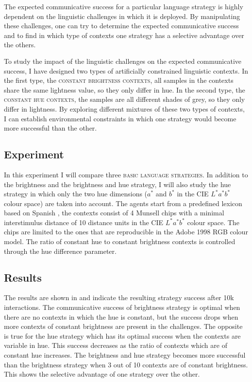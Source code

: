 The expected communicative success for a particular language strategy
is highly dependent on the linguistic challenges in which it is
deployed. By manipulating these challenges, one can try to determine
the expected communicative success and to find in which type of
contexts one strategy has a selective advantage over the others.

To study the impact of the linguistic challenges on the expected
communicative success, I have designed two types of artificially
constrained linguistic contexts. In the first type, the \textsc{constant
  brightness contexts}, all samples in the contexts share the same
lightness value, so they only differ in hue. In the second type, the
\textsc{constant hue contexts}, the samples are all different shades of
grey, so they only differ in lightness. By exploring different
mixtures of these two types of contexts, I can establish environmental
constraints in which one strategy would become more successful than
the other.

\subsection{Experiment}
\label{s:ls-selective-advantage-experiment}

In this experiment I will compare three \textsc{basic language
  strategies}. In addition to the brightness and the
brightness and hue strategy, I will also study the hue
  strategy in which only the two hue dimensions ($a^*$ and $b^*$ in
the CIE $L^*a^*b^*$ colour space) are taken into account. The agents
start from a predefined lexicon based on Spanish
\citep{lillo07locating}, the contexts consist of 4 Munsell chips
with a minimal interstimulus distance of 10 distance units in
the CIE $L^*a^*b^*$ colour space. The chips are limited to the ones
that are reproducible in the Adobe 1998 RGB colour model. The ratio
of constant hue to constant brightness contexts is controlled through
the hue difference parameter.

\subsection{Results}

The results are shown in  and
indicate the resulting strategy success after 10k interactions. The
communicative success of brightness strategy is optimal when
there are no contexts in which the hue is constant, but the success
drops when more contexts of constant brightness are present in the
challenges. The opposite is true for the hue strategy which has
its optimal success when the contexts are variable in hue. This
success decreases as the ratio of contexts which are of constant hue
increases. The brightness and hue strategy becomes more
successful than the brightness strategy when 3 out of 10
contexts are of constant brightness. This shows the selective
advantage of one strategy over the other.

